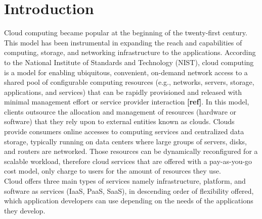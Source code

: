 \section{Introduction}\label{sec:Introduction}

\noindent
Cloud computing became popular at the beginning of the twenty-first century. This model has been instrumental in expanding the reach and capabilities of computing, storage, and networking infrastructure to the applications. According to the National Institute of Standards and Technology (NIST), cloud computing is a model for enabling ubiquitous, convenient, on-demand network access to a shared pool of configurable computing resources (e.g., networks, servers, storage, applications, and services) that can be rapidly provisioned and released with minimal management effort or service provider interaction \textbf{[ref]}. In this model, clients outsource the allocation and management of resources (hardware or software) that they rely upon to external entities known as clouds. Clouds provide consumers online accesses to computing services and centralized data storage, typically running on data centers where large groups of servers, disks, and routers are networked. Those resources can be dynamically reconfigured for a scalable workload, therefore cloud services that are offered with a pay-as-you-go cost model, only charge to users for the amount of resources they use.\\


Cloud offers three main types of services namely infrastructure, platform, and software as services (IaaS, PaaS, SaaS), in descending order of flexibility offered, which application developers can use depending on the needs of the applications they develop. 



